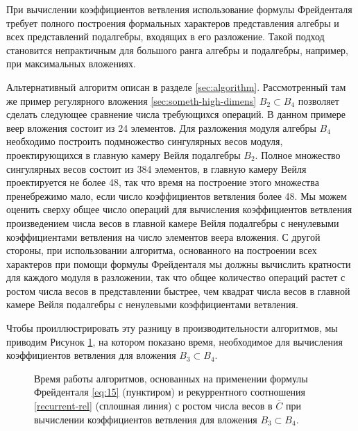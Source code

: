 При вычислении коэффициентов ветвления использование формулы Фрейденталя требует полного построения формальных характеров представления алгебры и всех представлений подалгебры, входящих в его разложение. Такой подход становится непрактичным для большого ранга алгебры и подалгебры, например, при максимальных вложениях. 

Альтернативный алгоритм описан в разделе \ref{sec:algorithm}. Рассмотренный там же пример регулярного вложения \ref{sec:someth-high-dimens}  $B_{2}\subset B_{4}$ позволяет сделать следующее сравнение числа требующихся операций. В данном примере веер вложения состоит из 24 элементов. Для разложения модуля алгебры  $B_{4}$ необходимо построить подмножество сингулярных весов модуля, проектирующихся в главную камеру Вейля подалгебры $B_{2}$. Полное множество сингулярных весов состоит из 384 элементов, в главную камеру Вейля проектируется не более 48, так что время на построение этого множества пренебрежимо мало, если число коэффициентов ветвления более 48. Мы можем оценить сверху общее число операций для вычисления коэффициентов ветвления произведением числа весов в главной камере Вейля подалгебры с ненулевыми коэффициентами ветвления на число элементов веера вложения. 
С другой стороны, при использовании алгоритма, основанного на построении всех характеров при помощи формулы Фрейденталя мы должны вычислить кратности для каждого модуля в разложении, так что общее количество операций растет с ростом числа весов в представлении быстрее, чем квадрат числа весов в главной камере Вейля подалгебры с ненулевыми коэффициентами ветвления. 

Чтобы проиллюстрировать эту разницу в производительности алгоритмов, мы приводим Рисунок \ref{fig:branching}, на котором показано время, необходимое для вычисления коэффициентов ветвления для вложения $B_{3}\subset B_{4}$.

\begin{figure}[h]
  \noindent{}
  \caption{Время работы алгоритмов, основанных на применении формулы Фрейденталя \eqref{eq:15} (пунктиром)  и рекуррентного соотношения \eqref{recurrent-rel} (сплошная линия) с ростом числа весов в  $\bar C$ при вычислении коэффициентов ветвления для вложения $B_{3}\subset B_{4}$.}
  \label{fig:branching}
\end{figure}

